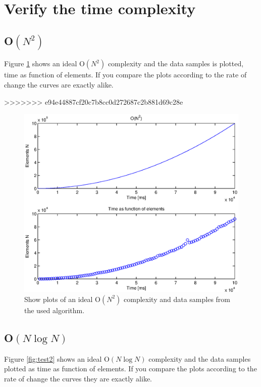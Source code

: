 \newpage
\section{Verify the time complexity}


\subsection{O\(\left( { N }^{ 2 } \right)\)}
Figure \ref{fig:test1} shows an ideal O\(\left( { N }^{ 2 } \right)\) complexity and the data samples is plotted, time as function of elements. If you compare the plots according to the rate of change the curves are exactly alike. 


>>>>>>> e94e44887cf20c7b8cc0d272687c2b881d69c28e
\begin{figure}[th!]
\centering
\includegraphics[width=1\textwidth]{./graphics/test1.eps}
\caption{Show plots of an ideal O\(\left( { N }^{ 2 } \right)\) complexity and data samples from the used algorithm.}

\label{fig:test1}
\end{figure}

\subsection{O\(\left( N\log {N }  \right) \)}
Figure \ref{fig:test2} shows an ideal O\(\left( N\log {N }  \right) \) complexity and the data samples plotted as time as function of elements. If you compare the plots according to the rate of change the curves they are exactly alike. 



